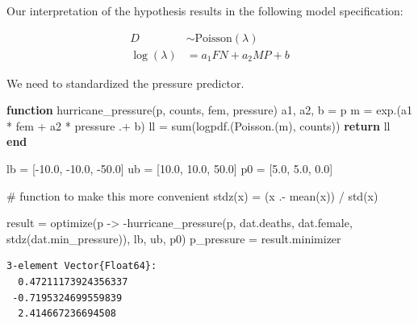 \documentclass[
  letterpaper,
  DIV=11,
  numbers=noendperiod]{scrartcl}
\newenvironment{Shaded}{\begin{snugshade}}{\end{snugshade}}
\newcommand{\CommentTok}[1]{\textcolor[rgb]{0.37,0.37,0.37}{#1}}
\newcommand{\ControlFlowTok}[1]{\textcolor[rgb]{0.00,0.23,0.31}{\textbf{#1}}}
\newcommand{\FloatTok}[1]{\textcolor[rgb]{0.68,0.00,0.00}{#1}}
\newcommand{\FunctionTok}[1]{\textcolor[rgb]{0.28,0.35,0.67}{#1}}
\newcommand{\KeywordTok}[1]{\textcolor[rgb]{0.00,0.23,0.31}{\textbf{#1}}}
\newcommand{\NormalTok}[1]{\textcolor[rgb]{0.00,0.23,0.31}{#1}}
\newcommand{\OperatorTok}[1]{\textcolor[rgb]{0.37,0.37,0.37}{#1}}
\newcommand*\circled[1]{\tikz[baseline=(char.base)]{
          \node[shape=circle,draw,inner sep=1pt] (char) {{\scriptsize#1}};}}
\begin{document}
Our interpretation of the hypothesis results in the following model
specification:

\[
\begin{aligned}
D &\sim \text{Poisson}(\lambda) \\
\log(\lambda) &= a_1 FN + a_2 MP + b
\end{aligned}
\]

We need to standardized the pressure predictor.

\label{annotated-cell-25}%
\begin{Shaded}
\begin{Highlighting}[]
\KeywordTok{function} \FunctionTok{hurricane\_pressure}\NormalTok{(p, counts, fem, pressure) }
\NormalTok{    a1, a2, b }\OperatorTok{=}\NormalTok{ p}
\NormalTok{    m }\OperatorTok{=} \FunctionTok{exp}\NormalTok{.(a1 }\OperatorTok{*}\NormalTok{ fem }\OperatorTok{+}\NormalTok{ a2 }\OperatorTok{*}\NormalTok{ pressure }\OperatorTok{.+}\NormalTok{ b)}
\NormalTok{    ll }\OperatorTok{=} \FunctionTok{sum}\NormalTok{(}\FunctionTok{logpdf}\NormalTok{.(}\FunctionTok{Poisson}\NormalTok{.(m), counts))}
    \ControlFlowTok{return}\NormalTok{ ll}
\KeywordTok{end}

\NormalTok{lb }\OperatorTok{=}\NormalTok{ [}\OperatorTok{{-}}\FloatTok{10.0}\NormalTok{, }\OperatorTok{{-}}\FloatTok{10.0}\NormalTok{, }\OperatorTok{{-}}\FloatTok{50.0}\NormalTok{]}
\NormalTok{ub }\OperatorTok{=}\NormalTok{ [}\FloatTok{10.0}\NormalTok{, }\FloatTok{10.0}\NormalTok{, }\FloatTok{50.0}\NormalTok{]}
\NormalTok{p0 }\OperatorTok{=}\NormalTok{ [}\FloatTok{5.0}\NormalTok{, }\FloatTok{5.0}\NormalTok{, }\FloatTok{0.0}\NormalTok{]}

\CommentTok{\# function to make this more convenient}
\FunctionTok{stdz}\NormalTok{(x) }\OperatorTok{=}\NormalTok{ (x }\OperatorTok{.{-}} \FunctionTok{mean}\NormalTok{(x)) }\OperatorTok{/} \FunctionTok{std}\NormalTok{(x) }\hspace*{\fill}\NormalTok{\circled{1}}

\NormalTok{result }\OperatorTok{=} \FunctionTok{optimize}\NormalTok{(p }\OperatorTok{{-}\textgreater{}} \FunctionTok{{-}hurricane\_pressure}\NormalTok{(p, dat.deaths, dat.female, }\FunctionTok{stdz}\NormalTok{(dat.min\_pressure)), lb, ub, p0)}
\NormalTok{p\_pressure }\OperatorTok{=}\NormalTok{ result.minimizer}
\end{Highlighting}
\end{Shaded}

\begin{verbatim}
3-element Vector{Float64}:
  0.47211173924356337
 -0.7195324699559839
  2.414667236694508
\end{verbatim}
\end{document}

